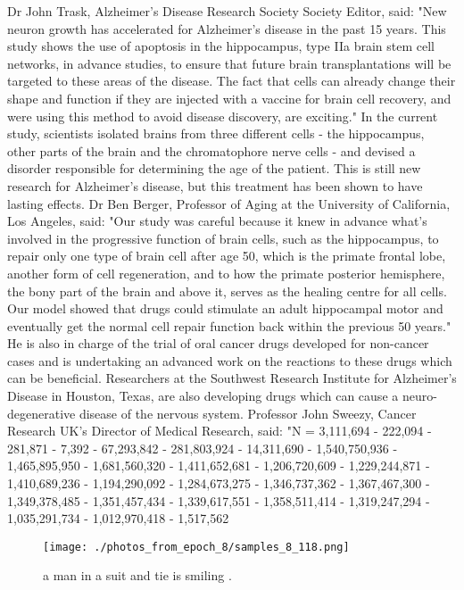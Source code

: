 \documentclass{article}%
\begin{document}
Dr John Trask, Alzheimer's Disease Research Society Society Editor, said: "New neuron growth has accelerated for Alzheimer's disease in the past 15 years. This study shows the use of apoptosis in the hippocampus, type IIa brain stem cell networks, in advance studies, to ensure that future brain transplantations will be targeted to these areas of the disease. The fact that cells can already change their shape and function if they are injected with a vaccine for brain cell recovery, and were using this method to avoid disease discovery, are exciting."\newline%
In the current study, scientists isolated brains from three different cells {-} the hippocampus, other parts of the brain and the chromatophore nerve cells {-} and devised a disorder responsible for determining the age of the patient. This is still new research for Alzheimer's disease, but this treatment has been shown to have lasting effects.\newline%
Dr Ben Berger, Professor of Aging at the University of California, Los Angeles, said: "Our study was careful because it knew in advance what's involved in the progressive function of brain cells, such as the hippocampus, to repair only one type of brain cell after age 50, which is the primate frontal lobe, another form of cell regeneration, and to how the primate posterior hemisphere, the bony part of the brain and above it, serves as the healing centre for all cells. Our model showed that drugs could stimulate an adult hippocampal motor and eventually get the normal cell repair function back within the previous 50 years."\newline%
He is also in charge of the trial of oral cancer drugs developed for non{-}cancer cases and is undertaking an advanced work on the reactions to these drugs which can be beneficial.\newline%
Researchers at the Southwest Research Institute for Alzheimer's Disease in Houston, Texas, are also developing drugs which can cause a neuro{-}degenerative disease of the nervous system. Professor John Sweezy, Cancer Research UK's Director of Medical Research, said: "N = 3,111,694 {-} 222,094 {-} 281,871 {-} 7,392 {-} 67,293,842 {-} 281,803,924 {-} 14,311,690 {-} 1,540,750,936 {-} 1,465,895,950 {-} 1,681,560,320 {-} 1,411,652,681 {-} 1,206,720,609 {-} 1,229,244,871 {-} 1,410,689,236 {-} 1,194,290,092 {-} 1,284,673,275 {-} 1,346,737,362 {-} 1,367,467,300 {-} 1,349,378,485 {-} 1,351,457,434 {-} 1,339,617,551 {-} 1,358,511,414 {-} 1,319,247,294 {-} 1,035,291,734 {-} 1,012,970,418 {-} 1,517,562

%


\begin{figure}[h!]%
\centering%
\texttt{[image: ./photos\_from\_epoch\_8/samples\_8\_118.png]}%
\caption{a man in a suit and tie is smiling .}%
\end{figure}

%
\end{document}
